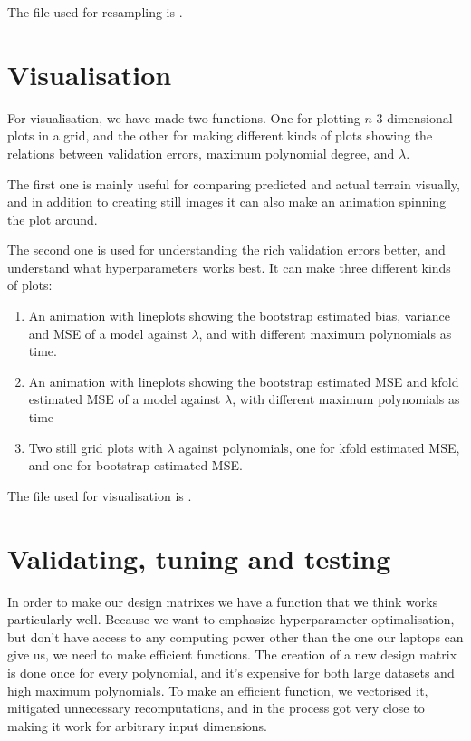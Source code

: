 \documentclass[11pt, a4paper]{report}
\begin{document}
The file used for resampling is .

\section{Visualisation}

For visualisation, we have made two functions. One for plotting $n$ 3-dimensional plots in a grid, and the other for making different kinds of plots showing the relations between validation errors, maximum polynomial degree, and $\lambda$.

The first one is mainly useful for comparing predicted and actual terrain visually, and in addition to creating still images it can also make an animation spinning the plot around.

The second one is used for understanding the rich validation errors better, and understand what hyperparameters works best. It can make three different kinds of plots:
\begin{enumerate}
    \item An animation with lineplots showing the bootstrap estimated bias, variance and MSE of a model against $\lambda$, and with different maximum polynomials as time.
    \item An animation with lineplots showing the bootstrap estimated MSE and kfold estimated MSE of a model against $\lambda$, with different maximum polynomials as time
    \item Two still grid plots with $\lambda$ against polynomials, one for kfold estimated MSE, and one for bootstrap estimated MSE.
\end{enumerate}

The file used for visualisation is .

\section{Validating, tuning and testing}

In order to make our design matrixes we have a function that we think works particularly well. Because we want to emphasize hyperparameter optimalisation, but don't have access to any computing power other than the one our laptops can give us, we need to make efficient functions. The creation of a new design matrix is done once for every polynomial, and it's expensive for both large datasets and high maximum polynomials. To make an efficient function, we vectorised it, mitigated unnecessary recomputations, and in the process got very close to making it work for arbitrary input dimensions.
\end{document}
